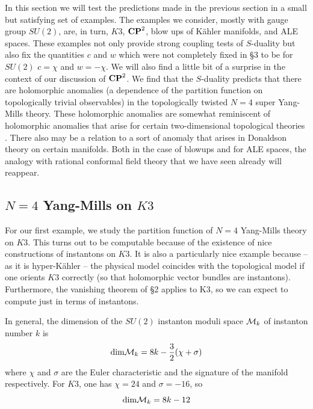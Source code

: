 \documentclass[12pt]{article}
\numberwithin{equation}{section}
\begin{document}
In this section we will test the predictions made in the
previous section in a small but satisfying set of examples.
The examples we consider, mostly with gauge group $SU(2)$,
are, in turn, $K3$, ${\bf CP}^2$, blow ups
of K\"ahler manifolds,
and ALE spaces.  These examples not only
provide strong coupling
tests of $S$-duality but also fix the quantities $c$ and $w$ which
were not completely fixed in \S3 to be for $SU(2)$
$c=\chi$ and $w=-\chi$.  We will also find a little bit of a  surprise
in the context of our discussion of ${\bf CP}^2$.  We find that the
$S$-duality predicts that there are holomorphic anomalies
(a dependence of the partition function on topologically trivial
observables)
in the topologically twisted $N=4$ super Yang-Mills theory.
These holomorphic anomalies are somewhat reminiscent
of holomorphic anomalies that arise for certain two-dimensional
topological theories \cite{bcov}.  There also may be a relation to a sort
of anomaly that arises in Donaldson theory on certain manifolds.
Both in the case of blowups and for ALE spaces, the analogy with
rational conformal field theory that we have seen already will reappear.

\subsection{\texorpdfstring{$N=4$}{N=4} Yang-Mills on \texorpdfstring{$K3$}{K3}}

For our first example, we study the partition function of $N=4$
Yang-Mills theory on $K3$.  This turns out to be computable because
of the existence of nice constructions of instantons on $K3$.
It is also a particularly nice example because -- as it is hyper-K\"ahler
-- the physical model coincides with the topological model if one
orients $K3$ correctly (so that holomorphic
vector bundles are instantons).
Furthermore, the vanishing theorem of \S2  applies to K3, so we
can expect to compute just in terms of instantons.

In general,
the dimension of the $SU(2)$ instanton moduli space ${\cal M}_k$
of instanton number $k$ is
%
\begin{equation}
  \label{diminst}
  {\rm dim}{\cal M}_k =8k-{3\over 2}(\chi +\sigma)
\end{equation}
%
where $\chi$ and $\sigma $ are the Euler characteristic and the
signature of the manifold respectively.  For $K3$, one has $\chi=24$ and
$\sigma =-16$, so
%
$${\rm dim}{\cal M}_k=8k -12$$
%
\end{document}
